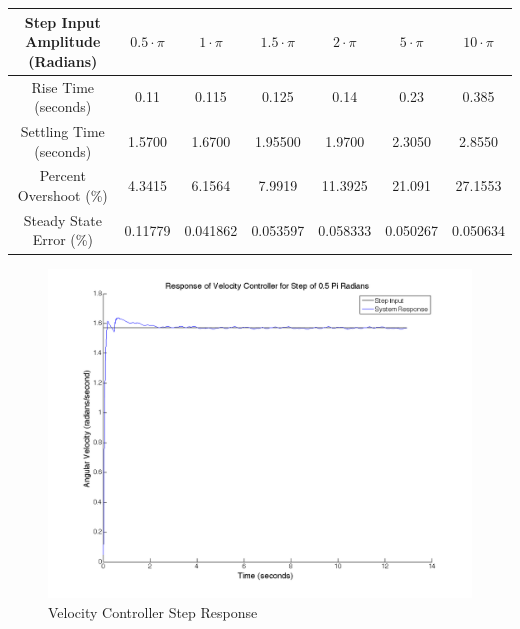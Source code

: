 \documentclass{article}
\theoremstyle{plain}
\theoremstyle{definition}
\theoremstyle{remark}
\begin{document}
\begin{table}
\begin{center}
    \begin{tabular}{|c|c|c|c|c|c|c|}
        \hline
        Step Input Amplitude (Radians) & $0.5 \cdot \pi$ & $1 \cdot \pi$ & $1.5 \cdot \pi$ & $2 \cdot \pi$ & $5 \cdot \pi$ & $10 \cdot \pi$ \\ \hline
        Rise Time (seconds)            & 0.11            & 0.115         & 0.125           & 0.14          & 0.23          & 0.385          \\ 
        Settling Time (seconds)        & 1.5700          &1.6700          & 1.95500           & 1.9700        & 2.3050        & 2.8550         \\ 
        Percent Overshoot (\%)         & 4.3415          & 6.1564        & 7.9919          & 11.3925       & 21.091        & 27.1553        \\ 
        Steady State Error (\%)        & 0.11779         & 0.041862      & 0.053597        & 0.058333      & 0.050267      & 0.050634       \\
        \hline
    \end{tabular}
\end{center}
\end{table}

\begin{figure}
\begin{center}
\includegraphics[width = 12cm]{velstep0_5Pi.png}
\caption{Velocity Controller Step Response}
\label{q6_1}
\end{center}
\end{figure}
\end{document}
